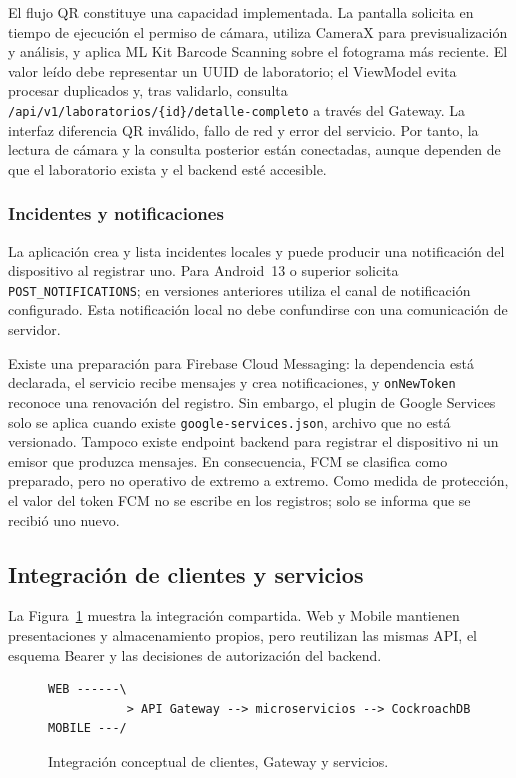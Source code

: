 El flujo QR constituye una capacidad implementada. La pantalla solicita en
tiempo de ejecución el permiso de cámara, utiliza CameraX para previsualización y
análisis, y aplica ML Kit Barcode Scanning sobre el fotograma más reciente. El
valor leído debe representar un UUID de laboratorio; el ViewModel evita procesar
duplicados y, tras validarlo, consulta
\texttt{/api/v1/laboratorios/\{id\}/detalle-completo} a través del Gateway. La
interfaz diferencia QR inválido, fallo de red y error del servicio. Por tanto,
la lectura de cámara y la consulta posterior están conectadas, aunque dependen de
que el laboratorio exista y el backend esté accesible.

\subsubsection{Incidentes y notificaciones}

La aplicación crea y lista incidentes locales y puede producir una notificación
del dispositivo al registrar uno. Para Android~13 o superior solicita
\texttt{POST\_NOTIFICATIONS}; en versiones anteriores utiliza el canal de
notificación configurado. Esta notificación local no debe confundirse con una
comunicación de servidor.

Existe una preparación para Firebase Cloud Messaging: la dependencia está
declarada, el servicio recibe mensajes y crea notificaciones, y
\texttt{onNewToken} reconoce una renovación del registro. Sin embargo, el plugin
de Google Services solo se aplica cuando existe \texttt{google-services.json},
archivo que no está versionado. Tampoco existe endpoint backend para registrar
el dispositivo ni un emisor que produzca mensajes. En consecuencia, FCM se
clasifica como preparado, pero no operativo de extremo a extremo. Como medida
de protección, el valor del token FCM no se escribe en los registros; solo se
informa que se recibió uno nuevo.

\subsection{Integración de clientes y servicios}
\label{subsec:integracion-clientes}

La Figura~\ref{fig:integracion-clientes} muestra la integración compartida. Web
y Mobile mantienen presentaciones y almacenamiento propios, pero reutilizan las
mismas API, el esquema Bearer y las decisiones de autorización del backend.

\begin{figure}[ht]
  \centering
  \begin{minipage}{0.88\linewidth}
\begin{verbatim}
WEB ------\
           > API Gateway --> microservicios --> CockroachDB
MOBILE ---/
\end{verbatim}
  \end{minipage}
  \caption{Integración conceptual de clientes, Gateway y servicios.}
  \label{fig:integracion-clientes}
\end{figure}

